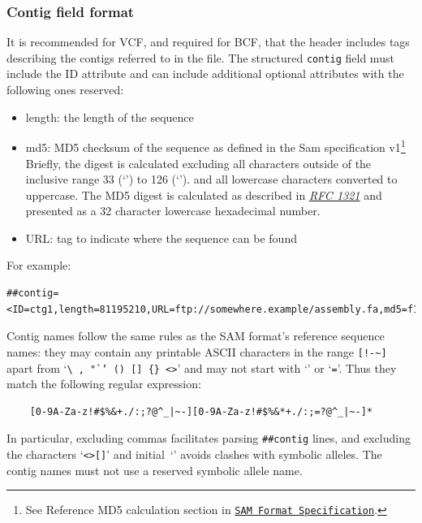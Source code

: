 \documentclass[8pt]{article}
\begin{document}
\subsubsection{Contig field format}
\label{sec-contig-field}
It is recommended for VCF, and required for BCF, that the header includes tags describing the contigs referred to in the file.
The structured \texttt{contig} field must include the ID attribute and can include additional optional attributes with
the following ones reserved:
\begin{itemize}
  \item length: the length of the sequence
  \item md5: MD5 checksum of the sequence as defined in the Sam specification v1\footnote{See Reference MD5 calculation
      section in \href{https://samtools.github.io/hts-specs/SAMv1.pdf}{\tt SAM Format Specification}.} Briefly, the digest
      is calculated excluding all characters outside of the inclusive range 33 (`') to 126 (`').
      and all lowercase characters converted to uppercase. The MD5 digest is calculated as described in
      \href{https://tools.ietf.org/html/rfc1321}{\sl RFC 1321} and presented as a 32 character lowercase hexadecimal number.
  \item URL: tag to indicate where the sequence can be found
\end{itemize}

For example:
{\scriptsize
\begin{verbatim}
##contig=<ID=ctg1,length=81195210,URL=ftp://somewhere.example/assembly.fa,md5=f126cdf8a6e0c7f379d618ff66beb2da,...>
\end{verbatim}
}
\noindent
Contig names follow the same rules as the SAM format's reference sequence names:
they may contain any printable ASCII characters in the range \verb|[!-~]| apart from `{\tt\verb|\|\,,\,"`'\,()\,[]\,\verb|{}|\,<>}' and may not start with `{\tt *}' or `{\tt =}'.
Thus they match the following regular expression:
\begin{verbatim}
    [0-9A-Za-z!#$%&+./:;?@^_|~-][0-9A-Za-z!#$%&*+./:;=?@^_|~-]*
\end{verbatim}
\noindent
In particular, excluding commas facilitates parsing \verb|##contig| lines, and excluding the characters `\verb|<>[]|' and initial~`{\tt *}' avoids clashes with symbolic alleles.
The contig names must not use a reserved symbolic allele name.
\end{document}
